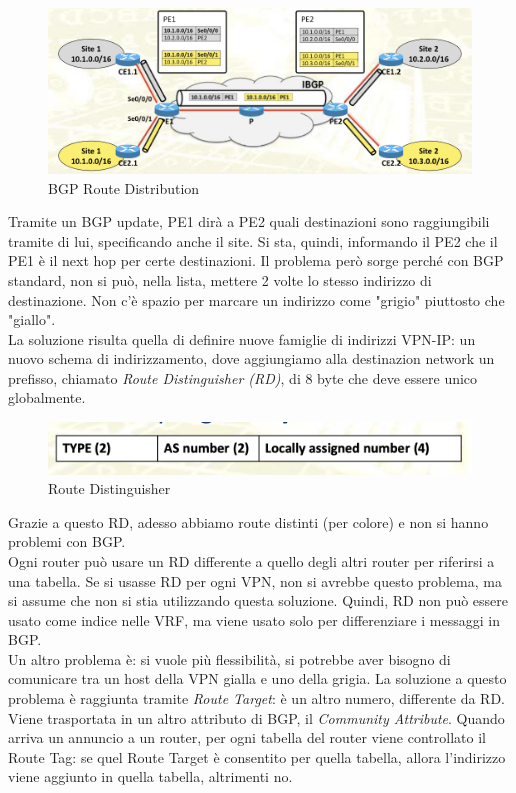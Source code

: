 \documentclass{article}
\begin{document}
\begin{figure}[H]
    \centering
    \includegraphics[scale=0.6]{figures/BGP route distribution.png}
    \caption{BGP Route Distribution}
\end{figure}
Tramite un BGP update, PE1 dirà a PE2 quali destinazioni sono raggiungibili tramite di lui, specificando anche il site. Si sta, quindi, informando il PE2 che il PE1 è il next hop per certe destinazioni. Il problema però sorge perché con BGP standard, non si può, nella lista, mettere 2 volte lo stesso indirizzo di destinazione. Non c'è spazio per marcare un indirizzo come "grigio" piuttosto che "giallo". \\ La soluzione risulta quella di definire nuove famiglie di indirizzi VPN-IP: un nuovo schema di indirizzamento, dove aggiungiamo alla destinazion network un prefisso, chiamato \textit{Route Distinguisher (RD)}, di 8 byte che deve essere unico globalmente. 
\begin{figure}[H]
    \centering
    \includegraphics[scale=0.6]{figures/Route distinguisher.png}
    \caption{Route Distinguisher}
\end{figure}
Grazie a questo RD, adesso abbiamo route distinti (per colore) e non si hanno problemi con BGP. \\ Ogni router può usare un RD differente a quello degli altri router per riferirsi a una tabella. Se si usasse RD per ogni VPN, non si avrebbe questo problema, ma si assume che non si stia utilizzando questa soluzione. Quindi, RD non può essere usato come indice nelle VRF, ma viene usato solo per differenziare i messaggi in BGP. \\ Un altro problema è: si vuole più flessibilità, si potrebbe aver bisogno di comunicare tra un host della VPN gialla e uno della grigia. La soluzione a questo problema è raggiunta tramite \textit{Route Target}: è un altro numero, differente da RD. Viene trasportata in un altro attributo di BGP, il \textit{Community Attribute}. Quando arriva un annuncio a un router, per ogni tabella del router viene controllato il Route Tag: se quel Route Target è consentito per quella tabella, allora l'indirizzo viene aggiunto in quella tabella, altrimenti no. 
\end{document}

